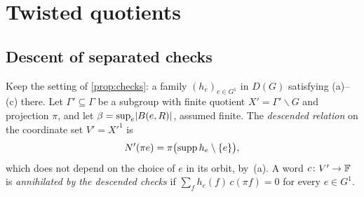 \section{Twisted quotients}\label{sec:descent}

\subsection{Descent of separated checks}\label{sec:descent-lemma}

Keep the setting of \cref{prop:checks}: a family $(h_e)_{e\in G^1}$ in $D(G)$ satisfying (a)--(c) there. Let
$\Gamma'\subseteq\Gamma$ be a subgroup with finite quotient $X'=\Gamma'\backslash G$ and projection $\pi$, and let
$\beta=\sup_e\lvert B(e,R) \rvert$, assumed finite. The \emph{descended relation} on the coordinate set $V'=X'^1$ is
\[
  N'(\pi e)=\pi\bigl(\operatorname{supp} h_e\setminus\{e\}\bigr),
\]
which does not depend on the choice of $e$ in its orbit, by~(a). A word $c\colon V'\to\mathbb{F}$ is \emph{annihilated by the
descended checks} if $\sum_fh_e(f)\,c(\pi f)=0$ for every $e\in G^1$.

